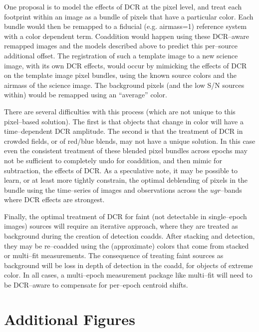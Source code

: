 \documentclass[DM,toc]{lsstdoc}
\begin{document}
One proposal is to model the effects of DCR at the pixel level, and
treat each footprint within an image as a bundle of pixels that have a
particular color.  Each bundle would then be remapped to a fiducial
(e.g. airmass=1) reference system with a color dependent term.
Coaddition would happen using these DCR--aware remapped images and the
models described above to predict this per--source additional offset.
The registration of such a template image to a new science image, with
its own DCR effects, would occur by mimicking the effects of DCR on
the template image pixel bundles, using the known source colors and
the airmass of the science image.  The background pixels (and the low
S/N sources within) would be remapped using an ``average'' color.

There are several difficulties with this process (which are not unique
to this pixel--based solution).  The first is that objects that change
in color will have a time--dependent DCR amplitude.  The second is
that the treatment of DCR in crowded fields, or of red/blue blends,
may not have a unique solution.  In this case even the consistent
treatment of these blended pixel bundles across epochs may not be
sufficient to completely undo for coaddition, and then mimic for
subtraction, the effects of DCR.  As a speculative note, it may be
possible to learn, or at least more tightly constrain, the optimal
deblending of pixels in the bundle using the time--series of images
and observations across the $ugr$--bands where DCR effects are
strongest.

Finally, the optimal treatment of DCR for faint (not detectable in
single--epoch images) sources will require an iterative approach,
where they are treated as background during the creation of detection
coadds.  After stacking and detection, they may be re--coadded using
the (approximate) colors that come from stacked or multi--fit
measurements.  The consequence of treating faint sources as background
will be loss in depth of detection in the coadd, for objects of
extreme color.  In all cases, a multi--epoch measurement package like
multi--fit will need to be DCR--aware to compensate for per--epoch
centroid shifts.



\clearpage
\appendix
\section{Additional Figures}
\end{document}
